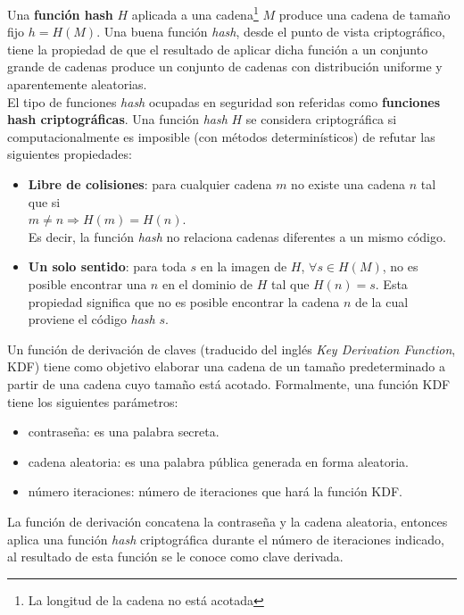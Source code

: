 Una \textbf{función hash} $H$ aplicada a una cadena\footnote{La longitud de la cadena no está acotada} $M$ produce una cadena de tamaño fijo $h=H(M)$. Una buena función \textit{hash}, desde el punto de vista criptográfico, tiene la propiedad de que el resultado de aplicar dicha función a un conjunto grande de cadenas produce un conjunto de cadenas con distribución uniforme y aparentemente aleatorias\cite{CryptographyNetworkSecurity}.\\
El tipo de funciones \textit{hash} ocupadas en seguridad son referidas como \textbf{funciones hash criptográficas}. Una función \textit{hash} $H$ se considera criptográfica si computacionalmente es imposible (con métodos determinísticos) de refutar las siguientes propiedades\cite{CryptographyNetworkSecurity}:
\begin{itemize}
	\item \textbf{Libre de colisiones}: para cualquier cadena $m$ no existe una cadena $n$ tal que si\\
	$m \neq n \Rightarrow H(m) = H(n)$.\\
	Es decir, la función \textit{hash} no relaciona cadenas diferentes a un mismo código.
	\item \textbf{Un solo sentido}: para toda $s$ en la imagen de $H$, $\forall s \in H(M)$, no es posible encontrar una $n$ en el dominio de $H$ tal que $H(n) = s$. Esta propiedad significa que no es posible encontrar la cadena $n$ de la cual proviene el código \textit{hash} $s$.
\end{itemize}
Un función de derivación de claves (traducido del inglés \textit{Key Derivation Function}, KDF) tiene como objetivo elaborar una cadena de un tamaño predeterminado a partir de una cadena cuyo tamaño está acotado. Formalmente, una función KDF tiene los siguientes parámetros\cite{UnderstandingCryptography, CryptographyTheoryPractice}:
\begin{itemize}
	\item contraseña: es una palabra secreta.
	\item cadena aleatoria: es una palabra pública generada en forma aleatoria.
	\item número iteraciones: número de iteraciones que hará la función KDF.
\end{itemize}
La función de derivación concatena la contraseña y la cadena aleatoria, entonces aplica una función \textit{hash} criptográfica durante el número de iteraciones indicado, al resultado de esta función se le conoce como clave derivada\cite{UnderstandingCryptography, CryptographyTheoryPractice}.

